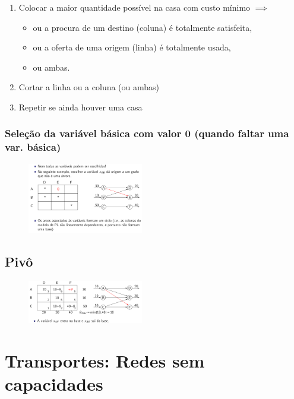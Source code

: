 \documentclass[10pt, a4paper]{article}
\begin{document}
\begin{multicols}{2}
\begin{enumerate}
    \item Colocar a maior quantidade possível na casa com custo mínimo \(\implies\)
    \begin{itemize}
        \item ou a procura de um destino (coluna) é totalmente satisfeita,
        \item ou a oferta de uma origem (linha) é totalmente usada,
        \item ou ambas.
    \end{itemize}
    \item Cortar a linha ou a coluna (ou ambas)
    \item Repetir se ainda houver uma casa
\end{enumerate}

\subsubsection{Seleção da variável básica com valor 0 (quando faltar uma var. básica)}

\begin{figure}[H]
    \centering
    \includegraphics[width=0.45\textwidth]{var_basica_0.png}
\end{figure}

\subsection{Pivô}

\begin{figure}[H]
    \centering
    \includegraphics[width=0.45\textwidth]{bipartidos_pivo.png}
\end{figure}



\section{Transportes: Redes sem capacidades}


\end{multicols}
\end{document}
